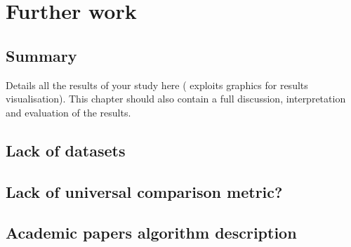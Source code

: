 
\chapter{Further work}
\label{chap:er1}
\ifpdf
    \graphicspath{{Chapter4/Figures/PNG/}{Chapter3/Figures/PDF/}{Chapter4/Figures/}}
\else
    \graphicspath{{Chapter4/Figures/EPS/}{Chapter3/Figures/}}
\fi


\section*{Summary}
Details all the results of your study here ( exploits graphics for results visualisation). 
This chapter should also contain a full discussion, interpretation and evaluation of the results. 



\section{Lack of datasets} 
\label{sec:gv2}
\section{Lack of universal comparison metric?} 
\label{sec:gv2}
\section{Academic papers algorithm description} 
\label{sec:gv2}

